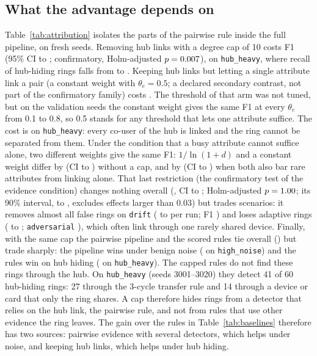\subsection{What the advantage depends on}
\label{sec:attribution}

Table~\ref{tab:attribution} isolates the parts of the pairwise rule inside the
full pipeline, on fresh seeds. Removing hub links with a degree cap of 10 costs
\RfCapD{} F1 (95\% CI \RfCapLo{} to \RfCapHi{}; confirmatory, Holm-adjusted
$p=0.007$),
\RfCapHub{} on \texttt{hub\_heavy}, where recall of hub-hiding rings falls from
\RfCapHHNo{} to \RfCapHHCap{}. Keeping hub links but letting a single attribute
link a pair (a constant weight with $\theta_e=0.5$; a declared secondary
contrast, not part of the confirmatory family) costs \RfNdOneD{}. The threshold
of that arm was not tuned, but on the validation seeds the constant weight gives
the same F1 at every $\theta_e$ from 0.1 to 0.8, so 0.5 stands for any
threshold that lets one attribute suffice. The cost is
\RfNdOneHub{} on \texttt{hub\_heavy}: every co-user of the hub is linked and the
ring cannot be separated from them. Under the condition that a busy attribute
cannot suffice alone, two different weights give the same F1: $1/\ln(1+d)$ and a
constant weight differ by \RfLogConstD{} (CI \RfLogConstLo{} to \RfLogConstHi{})
without a cap, and by \RfNdShapeD{} (CI \RfNdShapeLo{} to \RfNdShapeHi{}) when
both also bar rare attributes from linking alone. That last restriction
(the confirmatory test of the evidence condition) changes nothing overall
(\RfNdPrimD{}, CI \RfNdPrimLo{} to \RfNdPrimHi{}; Holm-adjusted $p=1.00$; its
90\% interval, \MgNdPrimLo{} to \MgNdPrimHi{}, excludes effects larger than 0.03) but trades scenarios: it removes
almost all false rings on \texttt{drift} (\RfNdDriftFalseOne{} to
\RfNdDriftFalseTwo{} per run; F1 \RfNdDriftD{}) and loses adaptive rings
(\RfNdAdaptOne{} to \RfNdAdaptTwo{}; \texttt{adversarial} \RfNdAdvD{}), which
often link through one rarely shared device. Finally, with the same cap the
pairwise pipeline and the scored rules tie overall (\RfPairCapVsRulesD{}) but
trade sharply: the pipeline wins under benign noise (\RfPairCapVsRulesNoise{} on
\texttt{high\_noise}) and the rules win on hub hiding
(\RfPairCapVsRulesHub{} on \texttt{hub\_heavy}). The capped rules do not find these
rings through the hub. On \texttt{hub\_heavy} (seeds 3001--3020) they detect 41 of
60 hub-hiding rings: 27 through the 3-cycle transfer rule and 14 through a device
or card that only the ring shares. A cap therefore hides rings from a detector
that relies on the hub link, the pairwise rule, and not from rules that use
other evidence the ring leaves. The gain over the rules in
Table~\ref{tab:baselines} therefore has two sources: pairwise evidence with
several detectors, which helps under noise, and keeping hub links, which helps
under hub hiding.

